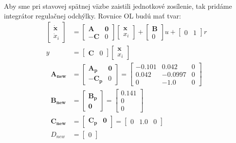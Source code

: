 \documentclass[journal]{IEEEtran}
\begin{document}
Aby sme pri stavovej spätnej väzbe zaistili jednotkové zosílenie, tak pridáme integrátor regulačnej odchýlky. Rovnice OL budú mať tvar:
	\begin{align}
	\begin{bmatrix}
	\bm{\dot{x}}\\\dot{x}_i
	\end{bmatrix}&=\begin{bmatrix}
	\bm{A} & \bm{0}\\ -\bm{C} & 0 
	\end{bmatrix}
	\begin{bmatrix}
	\bm{x}\\x_i
	\end{bmatrix}+\begin{bmatrix}
	\bm{B}\\0
	\end{bmatrix}u+\begin{bmatrix}
	0 & 1
	\end{bmatrix}r\nonumber\\
	y&=\begin{bmatrix}
	\bm{C} & 0
	\end{bmatrix}\begin{bmatrix}
	\bm{x}\\x_i
	\end{bmatrix}
	\end{align}
	\begin{align}
		\bm{A_{new}}&=\begin{bmatrix}
		\bm{A_p} & \bm{0}\\
		\bm{-C_p} & 0
		\end{bmatrix}=\begin{bmatrix}
		-0.101 & 0.042 & 0\\ 0.042 & -0.0997 & 0\\ 0 & -1.0 & 0
		\end{bmatrix}\\
		\bm{B_{new}}&=\begin{bmatrix}
		\bm{B_p}\\
		\bm{0}
		\end{bmatrix}=\begin{bmatrix}
		0.141\\ 0\\ 0
		\end{bmatrix}\\
		\bm{C_{new}}&=\begin{bmatrix}
		\bm{C_p} & \bm{0}
		\end{bmatrix}=\begin{bmatrix}
		0 & 1.0 & 0
		\end{bmatrix}\\
		D_{new}&=\begin{bmatrix}
		0
		\end{bmatrix}
	\end{align}
\end{document}
